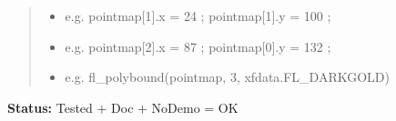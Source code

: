 \begin{boxedminipage}{\funcwidth}
\begin{quote}
\begin{itemize}
  \item 
e.g. pointmap{[}1{]}.x = 24 ; pointmap{[}1{]}.y = 100 ;


  \item 
e.g. pointmap{[}2{]}.x = 87 ; pointmap{[}0{]}.y = 132 ;


  \item 
e.g. fl\_polybound(pointmap, 3, xfdata.FL\_DARKGOLD)


\end{itemize}

\end{quote}

\textbf{Status:} 
Tested + Doc + NoDemo = OK


    \end{boxedminipage}

    \label{xformslib:flxbasic:fl_lines}

    \vspace{0.5ex}

